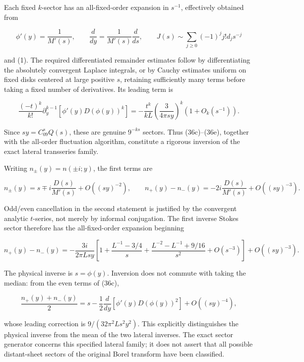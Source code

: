 \documentclass[11pt,letterpaper]{article}
\theoremstyle{remark}
\begin{document}
Each fixed \(k\)-sector has an all-fixed-order expansion in \(s^{-1}\),
effectively obtained from

\[
\phi'(y)=\frac1{M'(s)},\qquad \frac d{dy}=\frac1{M'(s)}\frac d{ds},
\qquad J(s)\sim\sum_{j\ge0}(-1)^jj!d_js^{-j}
\]

and (1). The required differentiated remainder estimates follow by
differentiating the absolutely convergent Laplace integrals, or by
Cauchy estimates uniform on fixed disks centered at large positive
\(s\), retaining sufficiently many terms before taking a fixed number of
derivatives. Its leading term is

\[
\frac{(-t)^k}{k!}\partial_y^{k-1}[\phi'(y)D(\phi(y))^k]
=-\frac{t^k}{kL}\left(\frac{3}{4\pi sy}\right)^k(1+O_k(s^{-1})).
\tag{36e}
\]

Since \(sy=C_09^sQ(s)\), these are genuine \(9^{-ks}\) sectors. Thus
(36c)--(36e), together with the all-order fluctuation algorithm,
constitute a rigorous inversion of the exact lateral transseries family.

Writing \(n_\pm(y)=n(\pm i;y)\), the first terms are

\[
n_\pm(y)=s\mp i\frac{D(s)}{M'(s)}+O((sy)^{-2}),
\qquad n_+(y)-n_-(y)=-2i\frac{D(s)}{M'(s)}+O((sy)^{-3}).
\tag{36f}
\]

Odd/even cancellation in the second statement is justified by the
convergent analytic \(t\)-series, not merely by informal conjugation.
The first inverse Stokes sector therefore has the all-fixed-order
expansion beginning

\[
\boxed{\displaystyle
n_+(y)-n_-(y)= -\frac{3i}{2\pi Lsy}
\left[1+\frac{L^{-1}-3/4}{s}
+\frac{L^{-2}-L^{-1}+9/16}{s^2}+O(s^{-3})\right]
+O((sy)^{-3}).}
\tag{36g}
\]

The physical inverse is \(s=\phi(y)\). Inversion does not commute with
taking the median: from the even terms of (36c),

\[
\frac{n_+(y)+n_-(y)}2
=s-\frac12\frac d{dy}\left[\phi'(y)D(\phi(y))^2\right]+O((sy)^{-4}),
\tag{36h}
\]

whose leading correction is \(9/(32\pi^2L s^2y^2)\). This explicitly
distinguishes the physical inverse from the mean of the two lateral
inverses. The exact sector generator concerns this specified lateral
family; it does not assert that all possible distant-sheet sectors of
the original Borel transform have been classified.
\end{document}
